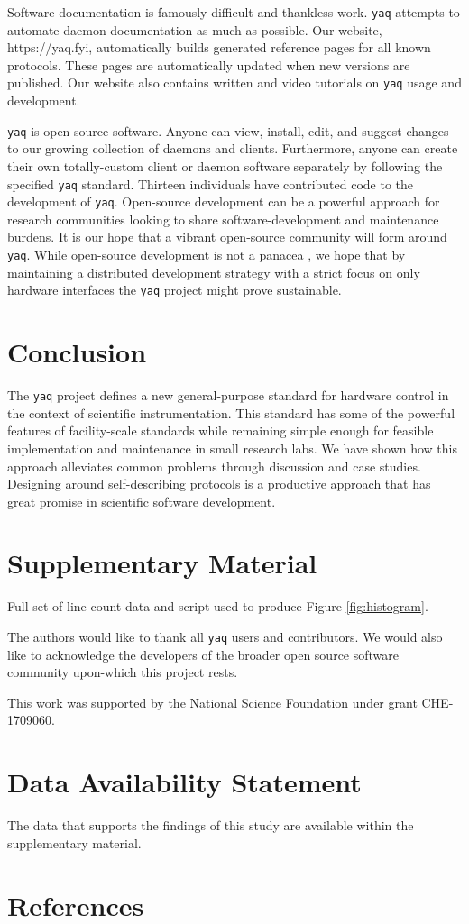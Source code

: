 \documentclass[aip, amsmath, amssymb, reprint,]{revtex4-2}
\newcommand\yaq{\texttt{yaq}}
\begin{document}
Software documentation is famously difficult and thankless work.
\yaq{} attempts to automate daemon documentation as much as possible.
Our website, https://yaq.fyi, automatically builds generated reference pages for all known protocols.
These pages are automatically updated when new versions are published.
Our website also contains written and video tutorials on \yaq{} usage and development.

\yaq{} is open source software.
Anyone can view, install, edit, and suggest changes to our growing collection of daemons and clients.
Furthermore, anyone can create their own totally-custom client or daemon software separately by following the specified \yaq{} standard.
Thirteen individuals have contributed code to the development of \yaq{}.
Open-source development can be a powerful approach for research communities looking to share software-development and maintenance burdens. \cite{CohenJeremy2021a}
It is our hope that a vibrant open-source community will form around \yaq{}.
While open-source development is not a panacea \cite{NowogrodzkiAnna2019a}, we hope that by maintaining a distributed development strategy with a strict focus on only hardware interfaces the \yaq{} project might prove sustainable.

\section{Conclusion}

The \yaq{} project defines a new general-purpose standard for hardware control in the context of scientific instrumentation.
This standard has some of the powerful features of facility-scale standards while remaining simple enough for feasible implementation and maintenance in small research labs.
We have shown how this approach alleviates common problems through discussion and case studies.
Designing around self-describing protocols is a productive approach that has great promise in scientific software development.

\section*{Supplementary Material}

Full set of line-count data and script used to produce Figure \ref{fig:histogram}.

\begin{acknowledgments}

The authors would like to thank all \yaq{} users and contributors.
We would also like to acknowledge the developers of the broader open source software community upon-which this project rests.

This work was supported by the National Science Foundation under grant CHE-1709060.

\end{acknowledgments}

\section*{Data Availability Statement}

The data that supports the findings of this study are available within the supplementary material.

\section*{References}
\nocite{*}

\end{document}
